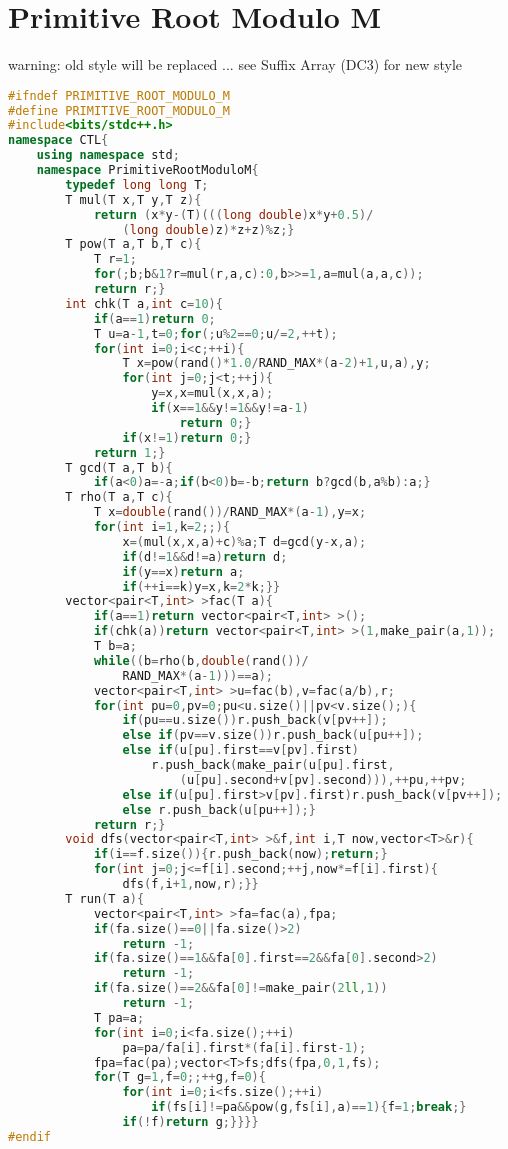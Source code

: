 \documentclass{book}
\begin{document}
\section{Primitive Root Modulo M}
warning: old style will be replaced ... see Suffix Array (DC3) for new style\begin{lstlisting}[language=C++,title={Primitive Root Modulo M.hpp (2949 bytes, 71 lines)}]
#ifndef PRIMITIVE_ROOT_MODULO_M
#define PRIMITIVE_ROOT_MODULO_M
#include<bits/stdc++.h>
namespace CTL{
    using namespace std;
    namespace PrimitiveRootModuloM{
        typedef long long T;
        T mul(T x,T y,T z){
            return (x*y-(T)(((long double)x*y+0.5)/
                (long double)z)*z+z)%z;}
        T pow(T a,T b,T c){
            T r=1;
            for(;b;b&1?r=mul(r,a,c):0,b>>=1,a=mul(a,a,c));
            return r;}
        int chk(T a,int c=10){
            if(a==1)return 0;
            T u=a-1,t=0;for(;u%2==0;u/=2,++t);
            for(int i=0;i<c;++i){
                T x=pow(rand()*1.0/RAND_MAX*(a-2)+1,u,a),y;
                for(int j=0;j<t;++j){
                    y=x,x=mul(x,x,a);
                    if(x==1&&y!=1&&y!=a-1)
                        return 0;}
                if(x!=1)return 0;}
            return 1;}
        T gcd(T a,T b){
            if(a<0)a=-a;if(b<0)b=-b;return b?gcd(b,a%b):a;}
        T rho(T a,T c){
            T x=double(rand())/RAND_MAX*(a-1),y=x;
            for(int i=1,k=2;;){
                x=(mul(x,x,a)+c)%a;T d=gcd(y-x,a);
                if(d!=1&&d!=a)return d;
                if(y==x)return a;
                if(++i==k)y=x,k=2*k;}}
        vector<pair<T,int> >fac(T a){
            if(a==1)return vector<pair<T,int> >();
            if(chk(a))return vector<pair<T,int> >(1,make_pair(a,1));
            T b=a;
            while((b=rho(b,double(rand())/
                RAND_MAX*(a-1)))==a);
            vector<pair<T,int> >u=fac(b),v=fac(a/b),r;
            for(int pu=0,pv=0;pu<u.size()||pv<v.size();){
                if(pu==u.size())r.push_back(v[pv++]);
                else if(pv==v.size())r.push_back(u[pu++]);
                else if(u[pu].first==v[pv].first)
                    r.push_back(make_pair(u[pu].first,
                        (u[pu].second+v[pv].second))),++pu,++pv;
                else if(u[pu].first>v[pv].first)r.push_back(v[pv++]);
                else r.push_back(u[pu++]);}
            return r;}
        void dfs(vector<pair<T,int> >&f,int i,T now,vector<T>&r){
            if(i==f.size()){r.push_back(now);return;}
            for(int j=0;j<=f[i].second;++j,now*=f[i].first){
                dfs(f,i+1,now,r);}}
        T run(T a){
            vector<pair<T,int> >fa=fac(a),fpa;
            if(fa.size()==0||fa.size()>2)
                return -1;
            if(fa.size()==1&&fa[0].first==2&&fa[0].second>2)
                return -1;
            if(fa.size()==2&&fa[0]!=make_pair(2ll,1))
                return -1;
            T pa=a;
            for(int i=0;i<fa.size();++i)
                pa=pa/fa[i].first*(fa[i].first-1);
            fpa=fac(pa);vector<T>fs;dfs(fpa,0,1,fs);
            for(T g=1,f=0;;++g,f=0){
                for(int i=0;i<fs.size();++i)
                    if(fs[i]!=pa&&pow(g,fs[i],a)==1){f=1;break;}
                if(!f)return g;}}}}
#endif\end{lstlisting}
\end{document}
